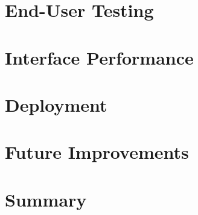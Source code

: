 \section{End-User Testing}

\section{Interface Performance}

\section{Deployment}

\section{Future Improvements} \label{client-improvements}

\section{Summary} 